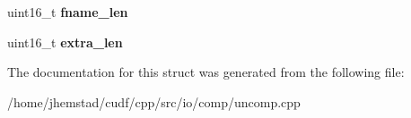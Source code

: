\begin{DoxyCompactItemize}
\item 
uint16\+\_\+t {\bfseries fname\+\_\+len}\hypertarget{structzip__lfh__s_a98a843994937fa0c8e1b0e855c35a182}{}\label{structzip__lfh__s_a98a843994937fa0c8e1b0e855c35a182}

\item 
uint16\+\_\+t {\bfseries extra\+\_\+len}\hypertarget{structzip__lfh__s_a53494ef0c04d11568304f1687a17f707}{}\label{structzip__lfh__s_a53494ef0c04d11568304f1687a17f707}

\end{DoxyCompactItemize}


The documentation for this struct was generated from the following file\+:\begin{DoxyCompactItemize}
\item 
/home/jhemstad/cudf/cpp/src/io/comp/uncomp.\+cpp\end{DoxyCompactItemize}
